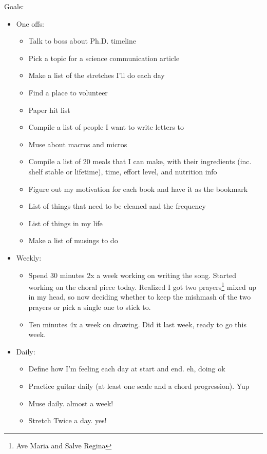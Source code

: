 \documentclass[12pt]{article}[titlepage]
\newcommand{\1}{\={a}}
\newcommand{\2}{\={e}}
\newcommand{\3}{\={\i}}
\newcommand{\4}{\=o}
\newcommand{\5}{\=u}
\newcommand{\6}{\={A}}
\renewcommand{\,}{\textsuperscript{,}}
\begin{document}
Goals:  
\begin{itemize}  
\item One offs:  
\begin{itemize}  
\item Talk to boss about Ph.D. timeline  
\item Pick a topic for a science communication article  
\item Make a list of the stretches I'll do each day  
\item Find a place to volunteer  
\item Paper hit list  
\item Compile a list of people I want to write letters to  
\item Muse about macros and micros  
\item Compile a list of 20 meals that I can make, with their ingredients (inc. shelf stable or lifetime), time, effort level, and nutrition info  
\item Figure out my motivation for each book and have it as the bookmark  
\item List of things that need to be cleaned and the frequency  
\item List of things in my life  
\item Make a list of musings to do  
\end{itemize}  
\item Weekly:  
\begin{itemize}  
\item Spend 30 minutes 2x a week working on writing the song. Started working on the choral piece today. Realized I got two prayers\footnote{Ave Maria and Salve Regina} mixed up in my head, so now deciding whether to keep the mishmash of the two prayers or pick a single one to stick to.  
\item Ten minutes 4x a week on drawing. Did it last week, ready to go this week.  
\end{itemize}  
\item Daily:  
\begin{itemize}  
\item Define how I'm feeling each day at start and end. eh, doing ok  
\item Practice guitar daily (at least one scale and a chord progression). Yup  
\item Muse daily. almost a week!  
\item Stretch Twice a day. yes!  
\end{itemize}  
\end{itemize}
\end{document}
